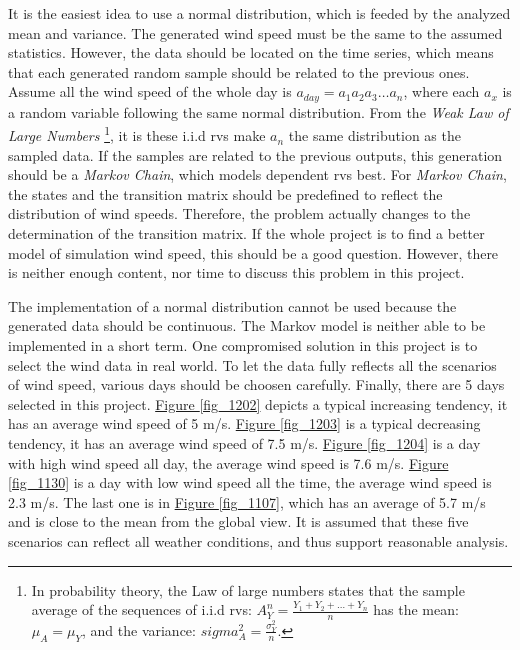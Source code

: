 \documentclass[12pt,a4paper]{report}
\begin{document}
                It is the easiest idea to use a normal distribution, which is feeded by the analyzed mean and variance. The generated wind speed must be the same to the assumed statistics. However, the data should be located on the time series, which means that each generated random sample should be related to the previous ones. Assume all the wind speed of the whole day is $a_{day} = a_1a_2a_3\dots a_n$, where each $a_x$ is a random variable following the same normal distribution. From the \emph{Weak Law of Large Numbers} \footnote{In probability theory, the Law of large numbers states that the sample average of the sequences of i.i.d rvs: $A_{Y}^n = \frac{Y_1 + Y_2 + \dots + Y_n}{n}$ has the mean: $\mu_A = \mu_Y$, and the variance: $sigma_A^2 = \frac{\sigma_Y^2}{n}$.}, it is these i.i.d rvs make $a_n$ the same distribution as the sampled data. If the samples are related to the previous outputs, this generation should be a \emph{Markov Chain}, which models dependent rvs best. For \emph{Markov Chain}, the states and the transition matrix should be predefined to reflect the distribution of wind speeds. Therefore, the problem actually changes to the determination of the transition matrix. If the whole project is to find a better model of simulation wind speed, this should be a good question. However, there is neither enough content, nor time to discuss this problem in this project.

                The implementation of a normal distribution cannot be used because the generated data should be continuous. The Markov model is neither able to be implemented in a short term. One compromised solution in this project is to select the wind data in real world. To let the data fully reflects all the scenarios of wind speed, various days should be choosen carefully. 
                Finally, there are 5 days selected in this project. \hyperref[fig_1202]{Figure \ref*{fig_1202}} depicts a typical increasing tendency, it has an average wind speed of 5 m/s. \hyperref[fig_1203]{Figure \ref*{fig_1203}} is a typical decreasing tendency, it has an average wind speed of 7.5 m/s. \hyperref[fig_1204]{Figure \ref*{fig_1204}} is a day with high wind speed all day, the average wind speed is 7.6 m/s. \hyperref[fig_1130]{Figure \ref*{fig_1130}} is a day with low wind speed all the time, the average wind speed is 2.3 m/s. The last one is in \hyperref[fig_1107]{Figure \ref*{fig_1107}}, which has an average of 5.7 m/s and is close to the mean from the global view. It is assumed that these five scenarios can reflect all weather conditions, and thus support reasonable analysis.
\end{document}
